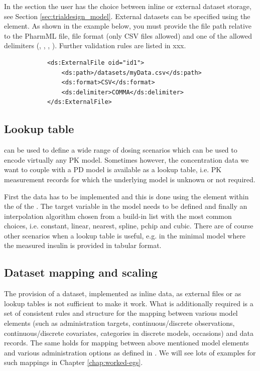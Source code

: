 In the  section the user has the choice between inline or
external dataset storage, see Section \ref{sec:trialdesign_model}.
External datasets can be specified using the  element. 
As shown in the example below, you must provide the file path relative to the PharmML file, 
file format (only CSV files allowed) and one of the allowed delimiters (, 
, , ). Further validation rules are listed in xxx.

\lstset{language=XML}
\begin{lstlisting}
            <ds:ExternalFile oid="id1">
                <ds:path>/datasets/myData.csv</ds:path>
                <ds:format>CSV</ds:format>
                <ds:delimiter>COMMA</ds:delimiter>
            </ds:ExternalFile>
\end{lstlisting}



\subsection{Lookup table}
\label{subsec:lookupTable}

 can be used to define a wide range of dosing scenarios 
which can be used to encode virtually any PK model. Sometimes however, 
the concentration data we want to couple with a PD model is available as a 
lookup table, i.e. PK measurement records for which the underlying model 
is unknown or not required.

First the data has to be implemented and this is done using the 
element within the  of the . The target variable 
in the model needs to be defined and finally an interpolation algorithm chosen 
from a build-in list with the most common choices, i.e. constant, linear, nearest, 
spline, pchip and cubic. There are of course other scenarios when a lookup table is 
useful, e.g. in the minimal model where the measured insulin is provided in tabular
format.


\subsection{Dataset mapping and scaling}
\label{subsec:datasetMapping}

The provision of a dataset, implemented as inline data, as external files or 
as lookup tables is not sufficient to make it work. What is additionally required 
is a set of consistent rules and structure for the mapping between 
various model elements (such as administration targets, continuous/discrete 
observations, continuous/discrete covariates, categories in discrete models, 
occasions) and data records. The same holds for mapping between above 
mentioned model elements and various administration options as defined 
in . We will see lots of examples for such mappings in 
Chapter \ref{chap:worked-egs}.

